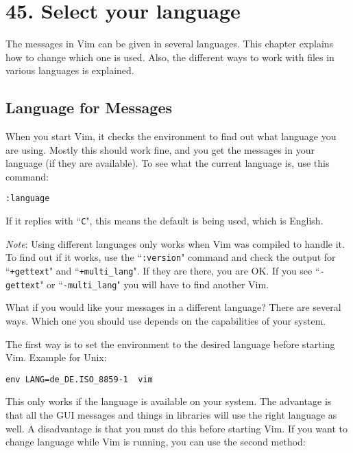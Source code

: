 \section{45. Select your language}
The messages in Vim can be given in several languages.
This chapter explains how to change which one is used.
Also, the different ways to work with files in various languages is explained.
\localtableofcontents
\subsection{Language for Messages}
When you start Vim, it checks the environment to find out what language you are using.
Mostly this should work fine, and you get the messages in your language (if they are available).
To see what the current language is, use this command:

\begin{Verbatim}[samepage=true]
 :language
\end{Verbatim}

If it replies with ``\texttt{C}", this means the default is being used, which is English.

\emph{Note}:
Using different languages only works when Vim was compiled to handle it.
To find out if it works, use the ``\texttt{:version}" command and check the output for ``\texttt{+gettext}" and ``\texttt{+multi\_lang}".
If they are there, you are OK.
If you see ``\texttt{-gettext}" or ``\texttt{-multi\_lang}" you will have to find another Vim.

What if you would like your messages in a different language?  There are several ways.
Which one you should use depends on the capabilities of your system.

The first way is to set the environment to the desired language before starting Vim.
Example for Unix:

\begin{Verbatim}[samepage=true]
 env LANG=de_DE.ISO_8859-1  vim
\end{Verbatim}

This only works if the language is available on your system.
The advantage is that all the GUI messages and things in libraries will use the right language as well.
A disadvantage is that you must do this before starting Vim.
If you want to change language while Vim is running, you can use the second method:

